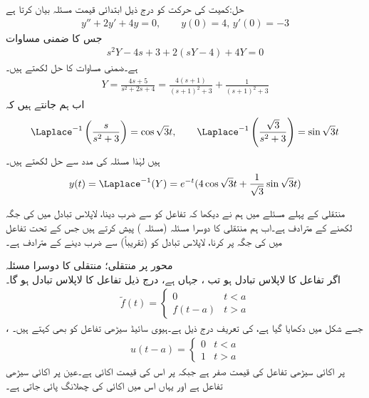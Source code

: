 حل:کمیت کی حرکت کو درج ذیل ابتدائی قیمت مسئلہ بیان کرتا ہے
\begin{align*}
y''+2y'+4y=0,\quad \quad y(0)=4, \, y'(0)=-3
\end{align*}
جس کا ضمنی مساوات 
\begin{align*}
s^2Y-4s+3+2(sY-4)+4Y=0
\end{align*}
ہے۔ضمنی مساوات کا حل لکھتے ہیں۔
\begin{align*}
Y=\frac{4s+5}{s^2+2s+4}=\frac{4(s+1)}{(s+1)^2+3}+\frac{1}{(s+1)^2+3}
\end{align*}
اب ہم جانتے ہیں کہ
\begin{align*}
\Laplace^{-1}\left(\frac{s}{s^2+3}\right)=\cos \sqrt{3}t, \quad \quad \Laplace^{-1}\left(\frac{\sqrt{3}}{s^2+3}\right)=\sin \sqrt{3}t
\end{align*}
ہیں لہٰذا مسئلہ  کی مدد سے حل لکھتے ہیں۔
\begin{align*}
y(t)=\Laplace^{-1}(Y)=e^{-t}(4\cos \sqrt{3}t+\frac{1}{\sqrt{3}}\sin \sqrt{3}t)
\end{align*}

منتقلی کے پہلے مسئلے میں ہم نے دیکھا کہ تفاعل  کو  سے ضرب دینا، لاپلاس تبادل میں  کی جگہ  لکھنے کے مترادف ہے۔اب ہم منتقلی کا دوسرا مسئلہ (مسئلہ ) پیش کرتے ہیں جس کے تحت تفاعل  میں  کی جگہ  پر کرنا، لاپلاس تبادل  کو (تقریباً)  سے ضرب دینے کے مترادف ہے۔

\quad {} محور پر منتقلی؛ منتقلی کا دوسرا مسئلہ\\
اگر تفاعل  کا لاپلاس تبادل  ہو تب ، جہاں  ہے، درج ذیل تفاعل کا لاپلاس تبادل ہو گا۔
\begin{align*}
\tilde{f}(t)=
\begin{cases}
0& t<a\\
f(t-a) &  t>a
\end{cases}
\end{align*}
، جسے شکل  میں دکھایا گیا ہے، کی تعریف درج ذیل ہے۔ہیوی سائیڈ سیڑھی تفاعل کو  بھی  کہتے ہیں۔
\begin{align}
u(t-a)=
\begin{cases}
0 & t<a\\
1& t>a
\end{cases}
\end{align}
 پر اکائی سیڑھی تفاعل کی قیمت صفر ہے جبکہ  پر اس کی قیمت اکائی ہے۔عین  پر اکائی سیڑھی تفاعل  ہے اور یہاں اس میں اکائی کی چھلانگ پائی جاتی ہے۔

